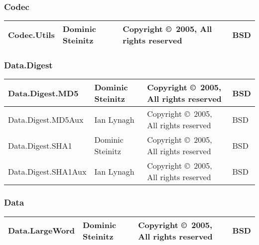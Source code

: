 \documentclass{article}
\begin{document}
\subsubsection{Codec}
\begin{tabular}{|p{6cm}|p{3cm}|p{3cm}|p{1cm}|}
\hline\hline
Codec.Utils & Dominic Steinitz &
Copyright \copyright\ 2005, All rights reserved & BSD \\
\hline\hline
\end{tabular}

\subsubsection{Data.Digest}
\begin{tabular}{|p{6cm}|p{3cm}|p{3cm}|p{1cm}|}
\hline\hline
Data.Digest.MD5 & Dominic Steinitz &
Copyright \copyright\ 2005, All rights reserved & BSD \\
\hline
Data.Digest.MD5Aux & Ian Lynagh &
Copyright \copyright\ 2005, All rights reserved & BSD \\
\hline
Data.Digest.SHA1 & Dominic Steinitz &
Copyright \copyright\ 2005, All rights reserved & BSD \\
\hline
Data.Digest.SHA1Aux & Ian Lynagh &
Copyright \copyright\ 2005, All rights reserved & BSD \\
\hline\hline
\end{tabular}

\subsubsection{Data}
\begin{tabular}{|p{6cm}|p{3cm}|p{3cm}|p{1cm}|}
\hline\hline
Data.LargeWord 
& Dominic Steinitz &
Copyright \copyright\ 2005, All rights reserved & BSD \\
\hline\hline
\end{tabular}
\end{document}
